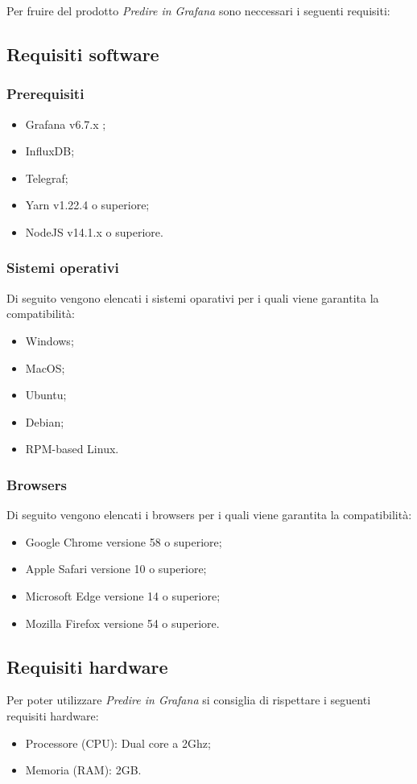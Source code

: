 \documentclass[../manuale-utente.tex]{subfiles}
\begin{document}
Per fruire del prodotto \textit{Predire in Grafana} sono neccessari i seguenti requisiti:

\subsection{Requisiti software}%
\label{subs:requisiti_softwaree}

\subsubsection{Prerequisiti}%
\label{sssec:prerequisiti}

\begin{itemize}
  \item Grafana v6.7.x ;
  \item InfluxDB;
  \item Telegraf;
  \item Yarn v1.22.4 o superiore;
  \item NodeJS v14.1.x o superiore.
\end{itemize}

\subsubsection{Sistemi operativi}%
\label{sssec:sistemi_operativi}
Di seguito vengono elencati i sistemi oparativi per i quali viene garantita la compatibilità:
\begin{itemize}
  \item Windows;
  \item MacOS;
  \item Ubuntu;
  \item Debian;
  \item RPM-based Linux.
\end{itemize}

\subsubsection{Browsers}%
\label{sssub:browsers}
Di seguito vengono elencati i browsers per i quali viene garantita la compatibilità:
\begin{itemize}
  \item Google Chrome versione 58 o superiore;
  \item Apple Safari versione 10 o superiore;
  \item Microsoft Edge versione 14 o superiore;
  \item Mozilla Firefox versione 54 o superiore.
\end{itemize}

\subsection{Requisiti hardware}%
\label{subs:requisiti_hardware}

Per poter utilizzare \textit{Predire in Grafana} si consiglia di rispettare i seguenti requisiti hardware:

\begin{itemize}
  \item Processore (CPU): Dual core a 2Ghz;
  \item Memoria (RAM): 2GB.
\end{itemize}
\end{document}
